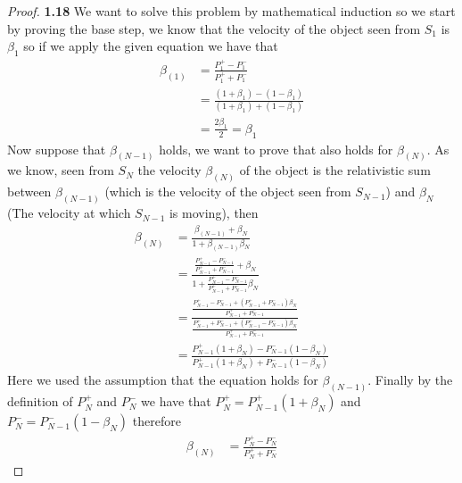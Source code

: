 \documentclass[11pt]{article}
\theoremstyle{definition}
\begin{document}
	\begin{proof}{\textbf{1.18}}
        We want to solve this problem by mathematical induction so we start by proving
        the base step, we know that the velocity of the object seen from $S_1$ is
        $\beta_1$ so if we apply the given equation we have that
        \begin{align*}
            \beta_{(1)} &= \frac{P_{1}^{+} - P_{1}^{-}}{P_{1}^{+} + P_{1}^{-}} \\
                &= \frac{(1+\beta_1)-(1-\beta_1)}{(1+\beta_1)+(1-\beta_1)} \\
                &= \frac{2\beta_1}{2} = \beta_1
        \end{align*}
        Now suppose that $\beta_{(N-1)}$ holds, we want to prove that also holds for
        $\beta_{(N)}$. As we know, seen from $S_N$ the velocity $\beta_{(N)}$ of
        the object is the relativistic sum between $\beta_{(N-1)}$ (which is the 
        velocity of the object seen from $S_{N-1}$) and $\beta_N$ (The velocity at
        which $S_{N-1}$ is moving), then
        \begin{align*}
            \beta_{(N)} &= \frac{\beta_{(N-1)} + \beta_N}{1 + \beta_{(N-1)}\beta_{N}} \\
                &= \frac{
                    \frac{P_{N-1}^+ - P_{N-1}^-}{P_{N-1}^+ + P_{N-1}^-} + \beta_N
                    }{
                    1 + \frac{P_{N-1}^+ - P_{N-1}^-}{P_{N-1}^+ + P_{N-1}^-}\beta_{N}
                    } \\
                &= \frac{
                    \frac{P_{N-1}^+ - P_{N-1}^- + (P_{N-1}^+ + P_{N-1}^-)\beta_N}{P_{N-1}^+ + P_{N-1}^-}
                    }{
                    \frac{P_{N-1}^+ + P_{N-1}^- + (P_{N-1}^+ - P_{N-1}^-)\beta_N}{P_{N-1}^+ + P_{N-1}^-}
                    } \\
                &= \frac{
                    P_{N-1}^+(1+\beta_N) - P_{N-1}^-(1-\beta_N)
                }{
                    P_{N-1}^+(1+\beta_N) + P_{N-1}^-(1-\beta_N)
                }
        \end{align*}
        Here we used the assumption that the equation holds for $\beta_{(N-1)}$.
        Finally by the definition of $P_N^+$ and $P_N^-$ we have that
        $P_N^+ = P_{N-1}^+(1+\beta_N)$ and $P_N^- = P_{N-1}^-(1-\beta_N)$
        therefore
        \begin{align*}
            \beta_{(N)} &= \frac{P_{N}^+ - P_{N}^-}{P_{N}^+ + P_{N}^-}
        \end{align*}
    \end{proof}
\end{document}
